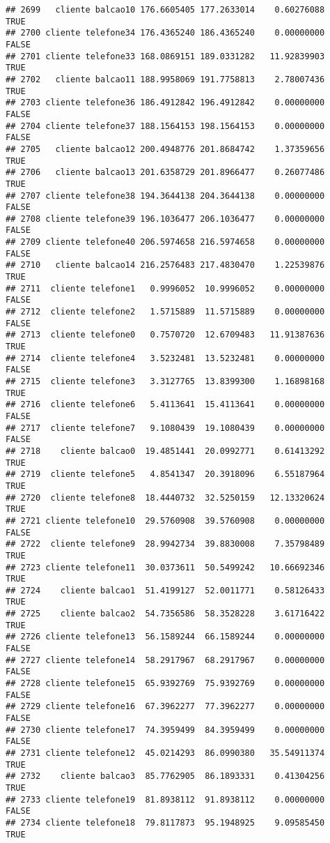 \documentclass[
]{article}
\begin{document}
\begin{verbatim}
## 2699   cliente balcao10 176.6605405 177.2633014    0.60276088     TRUE
## 2700 cliente telefone34 176.4365240 186.4365240    0.00000000    FALSE
## 2701 cliente telefone33 168.0869151 189.0331282   11.92839903     TRUE
## 2702   cliente balcao11 188.9958069 191.7758813    2.78007436     TRUE
## 2703 cliente telefone36 186.4912842 196.4912842    0.00000000    FALSE
## 2704 cliente telefone37 188.1564153 198.1564153    0.00000000    FALSE
## 2705   cliente balcao12 200.4948776 201.8684742    1.37359656     TRUE
## 2706   cliente balcao13 201.6358729 201.8966477    0.26077486     TRUE
## 2707 cliente telefone38 194.3644138 204.3644138    0.00000000    FALSE
## 2708 cliente telefone39 196.1036477 206.1036477    0.00000000    FALSE
## 2709 cliente telefone40 206.5974658 216.5974658    0.00000000    FALSE
## 2710   cliente balcao14 216.2576483 217.4830470    1.22539876     TRUE
## 2711  cliente telefone1   0.9996052  10.9996052    0.00000000    FALSE
## 2712  cliente telefone2   1.5715889  11.5715889    0.00000000    FALSE
## 2713  cliente telefone0   0.7570720  12.6709483   11.91387636     TRUE
## 2714  cliente telefone4   3.5232481  13.5232481    0.00000000    FALSE
## 2715  cliente telefone3   3.3127765  13.8399300    1.16898168     TRUE
## 2716  cliente telefone6   5.4113641  15.4113641    0.00000000    FALSE
## 2717  cliente telefone7   9.1080439  19.1080439    0.00000000    FALSE
## 2718    cliente balcao0  19.4851441  20.0992771    0.61413292     TRUE
## 2719  cliente telefone5   4.8541347  20.3918096    6.55187964     TRUE
## 2720  cliente telefone8  18.4440732  32.5250159   12.13320624     TRUE
## 2721 cliente telefone10  29.5760908  39.5760908    0.00000000    FALSE
## 2722  cliente telefone9  28.9942734  39.8830008    7.35798489     TRUE
## 2723 cliente telefone11  30.0373611  50.5499242   10.66692346     TRUE
## 2724    cliente balcao1  51.4199127  52.0011771    0.58126433     TRUE
## 2725    cliente balcao2  54.7356586  58.3528228    3.61716422     TRUE
## 2726 cliente telefone13  56.1589244  66.1589244    0.00000000    FALSE
## 2727 cliente telefone14  58.2917967  68.2917967    0.00000000    FALSE
## 2728 cliente telefone15  65.9392769  75.9392769    0.00000000    FALSE
## 2729 cliente telefone16  67.3962277  77.3962277    0.00000000    FALSE
## 2730 cliente telefone17  74.3959499  84.3959499    0.00000000    FALSE
## 2731 cliente telefone12  45.0214293  86.0990380   35.54911374     TRUE
## 2732    cliente balcao3  85.7762905  86.1893331    0.41304256     TRUE
## 2733 cliente telefone19  81.8938112  91.8938112    0.00000000    FALSE
## 2734 cliente telefone18  79.8117873  95.1948925    9.09585450     TRUE

\end{verbatim}
\end{document}
